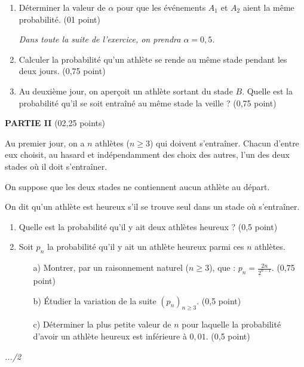 \documentclass[11pt]{article}
\begin{document}
\begin{enumerate}
    \item Déterminer la valeur de \( \alpha \) pour que les événements \( A_1 \) et \( A_2 \) aient la même probabilité. \hfill (01 point)

    \noindent \textit{Dans toute la suite de l’exercice, on prendra \( \alpha = 0{,}5 \).}

    \item Calculer la probabilité qu’un athlète se rende au même stade pendant les deux jours. \hfill (0,75 point)

    \item Au deuxième jour, on aperçoit un athlète sortant du stade \( B \). Quelle est la probabilité qu’il se soit entraîné au même stade la veille ? \hfill (0,75 point)
\end{enumerate}

\vspace{0.4cm}
\noindent
\textbf{PARTIE II} \hfill (02,25 points)

\vspace{0.2cm}
\noindent
Au premier jour, on a \( n \) athlètes (\( n \geq 3 \)) qui doivent s’entraîner. Chacun d’entre eux choisit, au hasard et indépendamment des choix des autres, l’un des deux stades où il doit s’entraîner.

\noindent
On suppose que les deux stades ne contiennent aucun athlète au départ.

\noindent
On dit qu’un athlète est heureux s’il se trouve seul dans un stade où s’entraîner.

\begin{enumerate}
    \item Quelle est la probabilité qu’il y ait deux athlètes heureux ? \hfill (0,5 point)

    \item Soit \( p_n \) la probabilité qu’il y ait un athlète heureux parmi ces \( n \) athlètes.
    \begin{enumerate}
        \item[a)] Montrer, par un raisonnement naturel (\( n \geq 3 \)), que : \( p_n = \frac{2n}{2^{n-1}} \). \hfill (0,75 point)
        \item[b)] Étudier la variation de la suite \( (p_n)_{n \geq 3} \). \hfill (0,5 point)
        \item[c)] Déterminer la plus petite valeur de \( n \) pour laquelle la probabilité d’avoir un athlète heureux est inférieure à \( 0{,}01 \). \hfill (0,5 point)
    \end{enumerate}
\end{enumerate}

\vfill
\begin{flushright}
    \textit{.../2}
\end{flushright}
\end{document}
